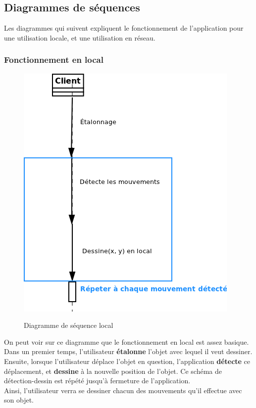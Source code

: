 \documentclass{report}
\begin{document}
			\subsection{Diagrammes de séquences}
			Les diagrammes qui suivent expliquent le fonctionnement de l'application pour une utilisation locale, et une utilisation en réseau.
			\subsubsection{Fonctionnement en local}
				\begin{figure}[!h]
						\centering
						\includegraphics[scale=0.6]{../images/sequence_local.png}\\
						\caption{Diagramme de séquence local}
						\label{Diagramme de séquence local}
				\end{figure}
				On peut voir sur ce diagramme que le fonctionnement en local est assez basique. Dans un premier temps, l'utilisateur \textbf{étalonne} l'objet avec lequel il veut dessiner. Ensuite, lorsque l'utilisateur déplace l'objet en question, l'application \textbf{détecte} ce déplacement, et \textbf{dessine} à la nouvelle position de l'objet. Ce schéma de détection-dessin est répété jusqu'à fermeture de l'application. \\
				Ainsi, l'utilisateur verra se dessiner chacun des mouvements qu'il effectue avec son objet.
\end{document}
